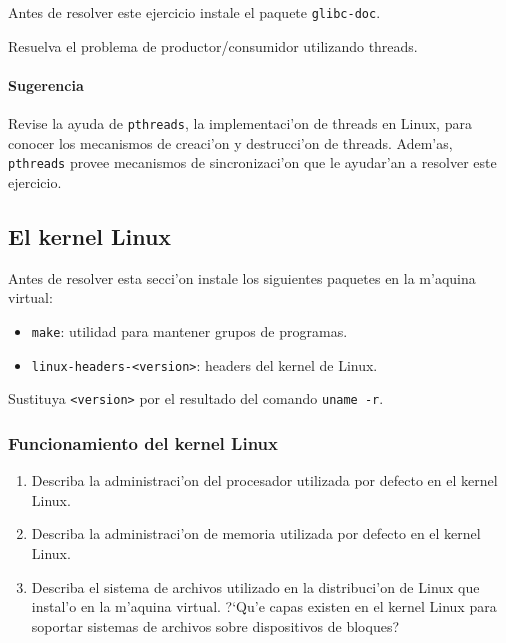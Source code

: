 Antes de resolver este ejercicio instale el paquete \texttt{glibc-doc}.

Resuelva el problema de productor/consumidor utilizando threads.

\paragraph{Sugerencia}

Revise la ayuda de \texttt{pthreads}, la implementaci'on de threads en Linux, para conocer los mecanismos de creaci'on y
destrucci'on de threads. Adem'as, \texttt{pthreads} provee mecanismos de sincronizaci'on que le ayudar'an a resolver este
ejercicio.



\subsection{El kernel Linux}

Antes de resolver esta secci'on instale los siguientes paquetes en la m'aquina virtual:

\begin{itemize}
\item \texttt{make}: utilidad para mantener grupos de programas.
\item \texttt{linux-headers-<version>}: headers del kernel de Linux.
\end{itemize}

Sustituya \texttt{<version>} por el resultado del comando \texttt{uname -r}.

\subsubsection{Funcionamiento del kernel Linux}

\begin{enumerate}

\item Describa la administraci'on del procesador utilizada por defecto en el kernel Linux.
\vspace{.5cm}



\item Describa la administraci'on de memoria utilizada por defecto en el kernel Linux.
\vspace{.5cm}


\item Describa el sistema de archivos utilizado en la distribuci'on de Linux que instal'o en la m'aquina virtual.
?`Qu'e capas existen en el kernel Linux para soportar sistemas de
archivos sobre dispositivos de bloques?

\vspace{.5cm}



\end{enumerate}

